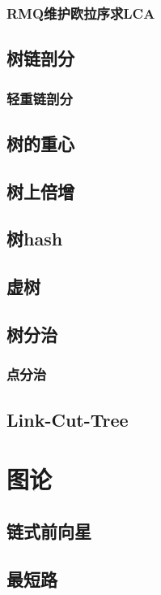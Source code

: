 \documentclass[a4paper,twocolumn]{article}
\begin{document}
\subsubsection{RMQ维护欧拉序求LCA}

\subsection{树链剖分}
\subsubsection{轻重链剖分}

\subsection{树的重心}

\subsection{树上倍增}

\subsection{树hash}

\subsection{虚树}

\subsection{树分治}
\subsubsection{点分治}

\subsection{Link-Cut-Tree}

\section{图论}
\subsection{链式前向星}

\subsection{最短路}
\end{document}
